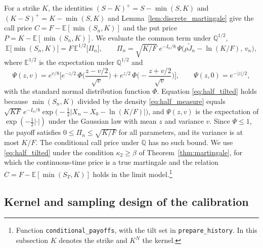 \documentclass{rQUF2e}
\theoremstyle{plain}
\theoremstyle{definition}
\theoremstyle{remark}
\newcommand{\E}{\mathbb{E}}
\newcommand{\Q}{\mathbb{Q}}
\begin{document}
For a strike $K$, the identities $(S-K)^+=S-\min(S,K)$ and $(K-S)^+=K-\min(S,K)$ and Lemma~\ref{lem:discrete_martingale} give the call price $C=F-\E[\min(S_n,K)]$ and the put price $P=K-\E[\min(S_n,K)]$. We evaluate the common term under $\Q^{1/2}$,
\begin{equation}\label{eq:half_tilted}
\E\big[\min(S_n,K)\big]=F\,\E^{1/2}\big[\Pi_n\big],\qquad \Pi_n=\sqrt{K/F}\;e^{-I_n/8}\,\Psi\big(\rho\tilde J_n-\ln(K/F),\,v_n\big),
\end{equation}
where $\E^{1/2}$ is the expectation under $\Q^{1/2}$ and
\begin{equation*}
\Psi(z,v)=e^{v/8}\bigg[e^{-z/2}\,\Phi\Big(\frac{z-v/2}{\sqrt v}\Big)+e^{z/2}\,\Phi\Big(-\frac{z+v/2}{\sqrt v}\Big)\bigg],\qquad \Psi(z,0)=e^{-|z|/2},
\end{equation*}
with the standard normal distribution function $\Phi$. Equation \eqref{eq:half_tilted} holds because $\min(S_n,K)$ divided by the density \eqref{eq:half_measure} equals $\sqrt{KF}\,e^{-I_n/8}\exp\big(-\tfrac12|X_n-X_0-\ln(K/F)|\big)$, and $\Psi(z,v)$ is the expectation of $\exp(-\tfrac12|\cdot|)$ under the Gaussian law with mean $z$ and variance $v$. Since $\Psi\le1$, the payoff satisfies $0\le\Pi_n\le\sqrt{K/F}$ for all parameters, and its variance is at most $K/F$. The conditional call price under $\Q$ has no such bound. We use \eqref{eq:half_tilted} under the condition $\kappa_2\ge\beta$ of Theorem~\ref{thm:martingale}, for which the continuous-time price is a true martingale and the relation $C=F-\E[\min(S_T,K)]$ holds in the limit model.\footnote{Function \texttt{conditional\_payoffs}, with the tilt set in \texttt{prepare\_history}. In this subsection $K$ denotes the strike and $K^N$ the kernel.}

\subsection{Kernel and sampling design of the calibration}\label{sec:calibration_design}
\end{document}
